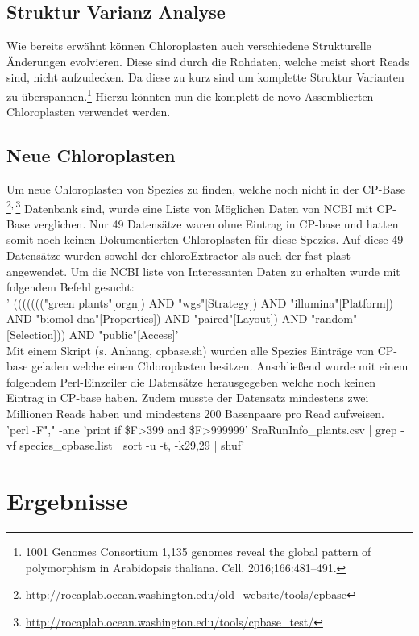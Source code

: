 \documentclass{scrartcl}
\begin{document}
\subsection{Struktur Varianz Analyse}
\label{sec-3-5}
Wie bereits erwähnt können Chloroplasten auch verschiedene Strukturelle Änderungen evolvieren. Diese sind durch die Rohdaten, welche meist short Reads sind, nicht aufzudecken.
Da diese zu kurz sind um komplette Struktur Varianten zu überspannen.\footnote{1001 Genomes Consortium 1,135 genomes reveal the global pattern of polymorphism in Arabidopsis thaliana. Cell. 2016;166:481–491.}
Hierzu könnten nun die komplett de novo Assemblierten Chloroplasten verwendet werden. 

\subsection{Neue Chloroplasten}
\label{sec-3-6}
Um neue Chloroplasten von Spezies zu finden, welche noch nicht in der CP-Base \footnote{\url{http://rocaplab.ocean.washington.edu/old_website/tools/cpbase}}\textsuperscript{,}\,\footnote{\url{http://rocaplab.ocean.washington.edu/tools/cpbase_test/}} Datenbank sind, wurde eine Liste von Möglichen Daten von NCBI mit CP-Base verglichen. Nur 49 Datensätze waren ohne 
Eintrag in CP-base und hatten somit noch keinen Dokumentierten Chloroplasten für diese Spezies. Auf diese 49 Datensätze wurden sowohl der chloroExtractor als auch der fast-plast angewendet. 
Um die NCBI liste von Interessanten Daten zu erhalten wurde mit folgendem Befehl gesucht:
\\
' ((((((("green plants"[orgn]) AND "wgs"[Strategy]) AND "illumina"[Platform]) AND "biomol dna"[Properties]) AND "paired"[Layout]) AND "random"[Selection])) AND "public"[Access]'
\\
Mit einem Skript (s. Anhang, cpbase.sh) wurden alle Spezies Einträge von CP-base geladen welche einen Chloroplasten besitzen. Anschließend wurde mit einem folgendem Perl-Einzeiler
die Datensätze herausgegeben welche noch keinen Eintrag in CP-base haben. Zudem musste der Datensatz mindestens zwei Millionen Reads haben und mindestens 200 Basenpaare pro Read
aufweisen.
\\
'perl -F"," -ane 'print if \$F\footnotemark[44]{}>399 and \$F\footnotemark[8]{}>999999' SraRunInfo\_plants.csv | grep -vf species\_cpbase.list | sort -u -t, -k29,29 | shuf'



\section{Ergebnisse}
\label{sec-4}
\end{document}
